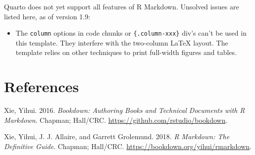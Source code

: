 \documentclass[
  french,
  british,
  11pt,
]{stylisharticle}
\newlength{\cslhangindent}
\newenvironment{CSLReferences}[2] %
 {\begin{list}{}{%
  \setlength{\itemindent}{0pt}
  \setlength{\leftmargin}{0pt}
  \setlength{\parsep}{0pt}
  \ifodd #1
   \setlength{\leftmargin}{\cslhangindent}
   \setlength{\itemindent}{-1\cslhangindent}
  \fi
  \setlength{\itemsep}{#2\baselineskip}}}
 {\end{list}}
\providecommand{\tightlist}{%
  \setlength{\itemsep}{0pt}\setlength{\parskip}{0pt}}
\begin{document}
Quarto does not yet support all features of R Markdown. Unsolved issues
are listed here, as of version 1.9:

\begin{itemize}
\tightlist
\item
  The \texttt{column} options in code chunks or \texttt{\{.column-xxx\}}
  div's can't be used in this template. They interfere with the
  two-column LaTeX layout. The template relies on other techniques to
  print full-width figures and tables.
\end{itemize}

\section*{References}\label{bibliography}

\protect{}\label{refs}
\begin{CSLReferences}{1}{1}
Xie, Yihui. 2016. \emph{Bookdown: Authoring Books and Technical
Documents with {R} Markdown}. Chapman; Hall/CRC.
\url{https://github.com/rstudio/bookdown}.

Xie, Yihui, J. J. Allaire, and Garrett Grolemund. 2018. \emph{R
Markdown: The Definitive Guide}. Chapman; Hall/CRC.
\url{https://bookdown.org/yihui/rmarkdown}.

\end{CSLReferences}
\end{document}
